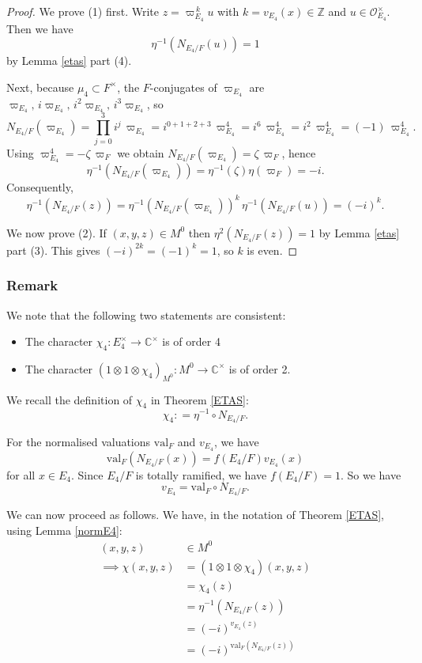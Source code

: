 \documentclass[11pt]{amsart}
\theoremstyle{remark}
\theoremstyle{definition}
\newcommand{\Z}{\mathbb{Z}}
\newcommand{\C}{\mathbb{C}}
\newcommand{\cO}{\mathcal{O}}
\def\val{\mathrm{val}}
\begin{document}
\begin{proof} We prove (1) first.   Write $z=\varpi_{E_4}^{\,k}u$ with $k=v_{E_4}(x)\in\Z$ and $u\in\cO_{E_4}^\times$.  
Then we have
\[
\eta^{-1}\!\left(N_{E_4/F}(u)\right)=1
\]
by Lemma \ref{etas} part (4).   

Next, because $\mu_4\subset F^\times$, the $F$-conjugates of $\varpi_{E_4}$ are
$\varpi_{E_4},\,i\varpi_{E_4},\,i^2\varpi_{E_4},\,i^3\varpi_{E_4}$, so
\[
N_{E_4/F}(\varpi_{E_4})
=\prod_{j=0}^3 i^j\,\varpi_{E_4}
=i^{0+1+2+3}\,\varpi_{E_4}^4
=i^6\,\varpi_{E_4}^4
=i^2\,\varpi_{E_4}^4
=(-1)\,\varpi_{E_4}^4.
\]
Using $\varpi_{E_4}^4=-\zeta\,\varpi_F$ we obtain $N_{E_4/F}(\varpi_{E_4})=\zeta\,\varpi_F$,
hence
\[
\eta^{-1}\!\left(N_{E_4/F}(\varpi_{E_4})\right)=\eta^{-1}(\zeta)\eta(\varpi_F)= - i.
\]
Consequently,
\[
\eta^{-1}\!\left(N_{E_4/F}(z)\right)
=\eta^{-1}\!\left(N_{E_4/F}(\varpi_{E_4})\right)^k\,\eta^{-1}\!\left(N_{E_4/F}(u)\right)
= (-i)^k.
\]

We now prove (2).   If $(x,y,z) \in M^0$ then $\eta^2(N_{E_4/F}(z))=1$ by   Lemma \ref{etas} part (3). This gives $(- i)^{2k} =  (-1)^k  = 1$, so $k$ is even.
\end{proof}

\subsubsection{Remark}    We note that the following two statements are consistent:
\begin{itemize}
\item  The character $\chi_4 \colon E_4^\times \to \C^\times$ \quad \textrm{is of order 4}
\item The character $(1 \otimes 1 \otimes \chi_4)_{M^0} \colon M^0 \to \C^\times$ \quad \textrm{is of order 2}.
\end{itemize} 

 We recall the definition of $\chi_4$ in Theorem \ref{ETAS}:
\[
\chi_4: = \eta^{-1} \circ N_{E_4/F}.
\]


For the normalised valuations $\val_F$ and $v_{E_4}$, we have 
\[
\val_F(N_{E_4/F}(x)) = f(E_4/F)v_{E_4}(x)
\]
for all $x \in E_4$.   Since $E_4/F$ is totally ramified, we have $f(E_4/F) = 1$.   So we have
\[
v_{E_4} = \val_F \circ N_{E_4/F}.
\] 
  

We can now proceed as follows.  We have,  in the notation of Theorem \ref{ETAS}, using Lemma \ref{normE4}:
\begin{align*}
(x,y,z) & \in M^0 \\
\implies \chi(x,y,z) &= (1 \otimes 1 \otimes \chi_4)(x,y,z)\\
 &=  \chi_4(z)\\
&= \eta^{-1}(N_{E_4/F}(z))\\
&= (-i)^{v_{E_4}(z)}\\
& = ( - i)^{\val_F(N_{E_4/F}(z))}
\end{align*}
 
\end{document}
